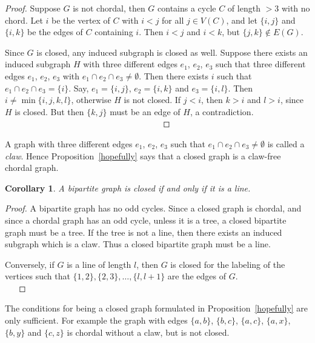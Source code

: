 \documentclass[11pt]{amsart}
\let\sect=\cap
\newtheorem{Corollary}[Theorem]{Corollary}
\begin{document}
\begin{proof} Suppose $G$ is not chordal, then $G$ contains a cycle $C$ of length $> 3$ with no chord. Let $i$ be the vertex of $C$ with $i<j$ for all $j\in V(C)$, and let $\{i,j\}$ and $\{i,k\}$ be the edges of $C$ containing $i$. Then $i<j$ and $i<k$, but $\{j,k\}\not\in E(G)$.

Since $G$ is closed, any induced subgraph is closed as well. Suppose there exists an induced subgraph $H$ with three different  edges  $e_1$,  $e_2$, $e_3$ such that three different  edges  $e_1$,  $e_2$, $e_3$ with $e_1\sect e_2 \sect e_3\neq \emptyset$. Then there exists $i$ such that  $e_1\sect e_2 \sect e_3=\{i\}$. Say, $e_1=\{i,j\}$, $e_2=\{i,k\}$ and  $e_3=\{i,l\}$. Then $i\neq \min\{i,j,k,l\}$, otherwise $H$ is not closed. If $j<i$, then $k>i$ and $l>i$,  since $H$ is closed. But then $\{k,j\}$ must be an edge of $H$, a contradiction.
\, \, \, \, \, \, \, \, \, \,
\, \, \, \, \, \, \, \, \, \,
\, \, \, \, \, \, \, \, \, \,
\, \, \, \, \, \, \, \, \, \,
\, \, \, \, \, \, \, \, \, \,
\end{proof}

A graph with three different  edges  $e_1$,  $e_2$, $e_3$ such that  $e_1\sect e_2 \sect e_3\neq \emptyset$ is called a {\em claw}. Hence Proposition~\ref{hopefully} says that a closed graph is a claw-free chordal graph.

\begin{Corollary}
\label{bipartite}
A  bipartite graph is closed if and only if it is a line.
\end{Corollary}

\begin{proof} A bipartite graph has no odd cycles. Since a closed graph is chordal, and since a chordal graph has an odd cycle, unless it is a tree, a closed bipartite graph must be a tree. If the tree is not a line, then there exists an induced subgraph which is a claw. Thus a closed bipartite graph must be a line.

Conversely, if $G$ is a line of length $l$, then $G$ is closed for the   labeling of the vertices such that  $\{1,2\},\{2,3\},\ldots,\{l,l+1\}$ are the  edges of $G$.
\, \, \, \, \, \, \, \, \, \,
\, \, \, \, \, \, \, \, \, \,
\end{proof}

The conditions for being a closed graph formulated in Proposition~\ref{hopefully} are only sufficient. For example the graph with edges $\{a,b\}$, $\{b,c\}$, $\{a,c\}$, $\{a,x\}$,$\{b,y\}$ and $\{c,z\}$ is chordal without a claw, but is not closed.
\end{document}
